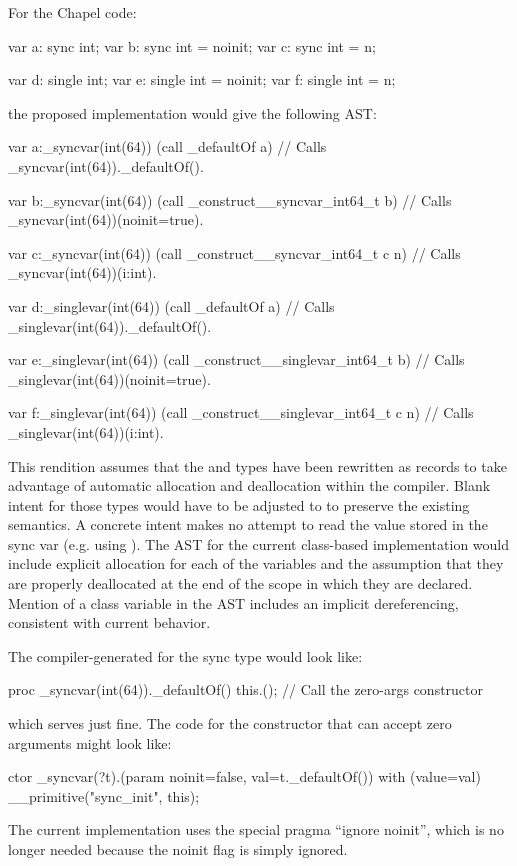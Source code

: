 For the Chapel code:
\begin{chapel}
  var a: sync int;
  var b: sync int = noinit;
  var c: sync int = n;

  var d: single int;
  var e: single int = noinit;
  var f: single int = n;
\end{chapel}
\noindent
the proposed implementation would give the following AST:
\begin{numberedchapel}
  var a:_syncvar(int(64))
  (call _defaultOf a) // Calls _syncvar(int(64))._defaultOf().

  var b:_syncvar(int(64))
  (call _construct__syncvar_int64_t b) // Calls _syncvar(int(64))(noinit=true).

  var c:_syncvar(int(64))
  (call _construct__syncvar_int64_t c n) // Calls _syncvar(int(64))(i:int).

  var d:_singlevar(int(64))
  (call _defaultOf a) // Calls _singlevar(int(64))._defaultOf().

  var e:_singlevar(int(64))
  (call _construct__singlevar_int64_t b) // Calls _singlevar(int(64))(noinit=true).

  var f:_singlevar(int(64))
  (call _construct__singlevar_int64_t c n) // Calls _singlevar(int(64))(i:int).
\end{numberedchapel}
\noindent
This rendition assumes that the  and  types have been
rewritten as records to take advantage of automatic allocation and deallocation within the
compiler.  Blank intent for those types would have to be adjusted to  to
preserve the existing semantics.  A concrete  intent makes no attempt to read 
the value stored in the sync var (e.g. using ).  The AST for the current
class-based implementation would include explicit allocation for each of the variables and the
assumption that they are properly deallocated at the end of the scope in which they are declared.
Mention of a class variable in the AST includes an implicit dereferencing, consistent with
current behavior.

The compiler-generated  for the sync type would look like:
\begin{chapel}
  proc _syncvar(int(64))._defaultOf() {
    this.(); // Call the zero-args constructor
  }
\end{chapel}
\noindent
which serves just fine.  The code for the constructor that can accept zero arguments might
look like:
\begin{chapel}
  ctor _syncvar(?t).(param noinit=false, val=t._defaultOf()) {
    with (value=val)
    __primitive("sync_init", this);
  }
\end{chapel}
The current implementation uses the special pragma ``ignore noinit'', which is no longer
needed because the noinit flag is simply ignored.

